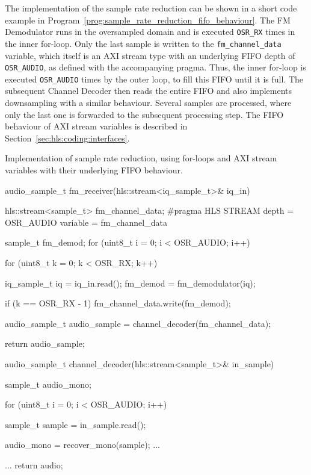 The implementation of the sample rate reduction can be shown in a short code example in Program~\ref{prog:sample_rate_reduction_fifo_behaviour}.
The FM Demodulator runs in the oversampled domain and is executed \texttt{OSR\_RX} times in the inner for-loop.
Only the last sample is written to the \texttt{fm\_channel\_data} variable, which itself is an AXI stream type with an underlying FIFO depth of \texttt{OSR\_AUDIO}, as defined with the accompanying pragma.
Thus, the inner for-loop is executed \texttt{OSR\_AUDIO} times by the outer loop, to fill this FIFO until it is full.
The subsequent Channel Decoder then reads the entire FIFO and also implements downsampling with a similar behaviour.
Several samples are processed, where only the last one is forwarded to the subsequent processing step.
The FIFO behaviour of AXI stream variables is described in Section~\ref{sec:hls:coding:interfaces}.


\begin{program}
  \caption{Implementation of sample rate reduction, using for-loops and AXI stream variables with their underlying FIFO behaviour.}
  \label{prog:sample_rate_reduction_fifo_behaviour}
\begin{CppCode}
audio_sample_t fm_receiver(hls::stream<iq_sample_t>& iq_in) {

  hls::stream<sample_t> fm_channel_data;
  #pragma HLS STREAM depth = OSR_AUDIO variable = fm_channel_data

  sample_t fm_demod;
  for (uint8_t i = 0; i < OSR_AUDIO; i++) {
    for (uint8_t k = 0; k < OSR_RX; k++) {
      iq_sample_t iq = iq_in.read();
      fm_demod       = fm_demodulator(iq);

      if (k == OSR_RX - 1) {
        fm_channel_data.write(fm_demod);
      }
    }
  }

  audio_sample_t audio_sample = channel_decoder(fm_channel_data);

  return audio_sample;
}


audio_sample_t channel_decoder(hls::stream<sample_t>& in_sample) {
  sample_t audio_mono;

  for (uint8_t i = 0; i < OSR_AUDIO; i++) {
    sample_t sample = in_sample.read();

    audio_mono = recover_mono(sample);
    ...
  }
  ...
  return audio;
}
\end{CppCode}
\end{program}
